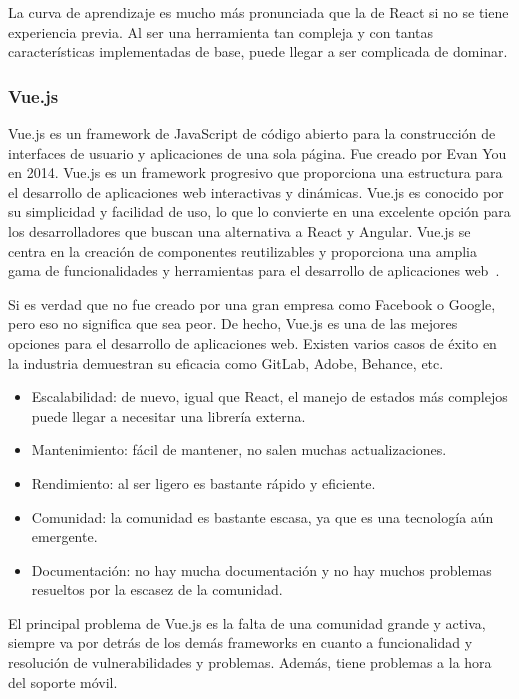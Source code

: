 La curva de aprendizaje es mucho más pronunciada que la de React si no se tiene experiencia previa. Al ser una herramienta tan compleja y con tantas características implementadas de base, puede llegar a ser complicada de dominar. 

\subsubsection{Vue.js}

Vue.js es un framework de JavaScript de código abierto para la construcción de interfaces de usuario y aplicaciones de una sola página. Fue creado por Evan You en 2014. Vue.js es un framework progresivo que proporciona una estructura para el desarrollo de aplicaciones web interactivas y dinámicas. Vue.js es conocido por su simplicidad y facilidad de uso, lo que lo convierte en una excelente opción para los desarrolladores que buscan una alternativa a React y Angular. Vue.js se centra en la creación de componentes reutilizables y proporciona una amplia gama de funcionalidades y herramientas para el desarrollo de aplicaciones web~\cite{vuejs-wikipedia}.

Si es verdad que no fue creado por una gran empresa como Facebook o Google, pero eso no significa que sea peor. De hecho, Vue.js es una de las mejores opciones para el desarrollo de aplicaciones web. Existen varios casos de éxito en la industria demuestran su eficacia como GitLab, Adobe, Behance, etc.

\begin{itemize}
    \item[\bien] Escalabilidad: de nuevo, igual que React, el manejo de estados más complejos puede llegar a necesitar una librería externa.
    \item[\bien] Mantenimiento: fácil de mantener, no salen muchas actualizaciones.
    \item[\bien] Rendimiento: al ser ligero es bastante rápido y eficiente.
    \item[\mal] Comunidad: la comunidad es bastante escasa, ya que es una tecnología aún emergente.
    \item[\mal] Documentación: no hay mucha documentación y no hay muchos problemas resueltos por la escasez de la comunidad.
\end{itemize}

El principal problema de Vue.js es la falta de una comunidad grande y activa, siempre va por detrás de los demás frameworks en cuanto a funcionalidad y resolución de vulnerabilidades y problemas. Además, tiene problemas a la hora del soporte móvil.

